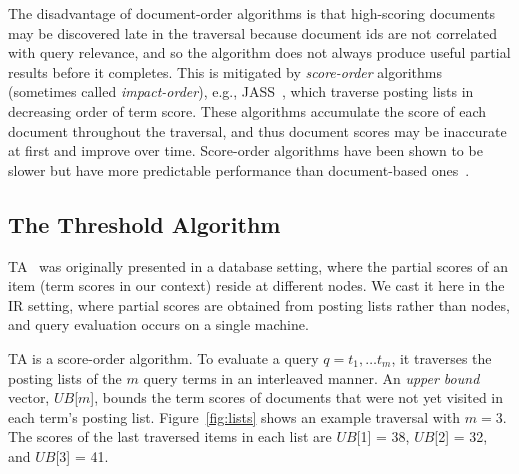 
The disadvantage of  document-order algorithms is that high-scoring documents may  be discovered late in the traversal because document ids  are not correlated with query relevance,
and so the algorithm does not always produce useful partial results before it completes.
This is mitigated by \emph{score-order} algorithms (sometimes called \emph{impact-order}), e.g.,  JASS~\cite{Lin:2015}, which traverse posting lists in decreasing order of term score. 
These algorithms accumulate the score of each document throughout the traversal, and thus document scores may be inaccurate at first and improve over time. 
Score-order algorithms have been shown to be slower but  have more predictable performance than document-based ones~\cite{Crane:2017}.

\subsection{The Threshold Algorithm}

TA~\cite{Fagin:2003} was originally presented in a database setting, where the partial scores of an item (term scores  in our context)  reside at different nodes. We cast it here in the IR setting, where partial scores are obtained from posting lists rather than nodes, and query evaluation occurs on a single machine.

TA is a score-order algorithm.
To evaluate a query $q = t_1, \dots t_m$, it  traverses the posting lists of the $m$ query terms in an interleaved manner. 
An \emph{upper bound} vector, $UB$[$m$], 
bounds the term scores of documents that were not yet visited in each term's posting list. 
%
Figure~\ref{fig:lists} shows
an example traversal with $m=3$.  The scores of the last traversed items in each list are $UB$[1] = 38, $UB$[2] = 32, and $UB$[3] = 41. 


